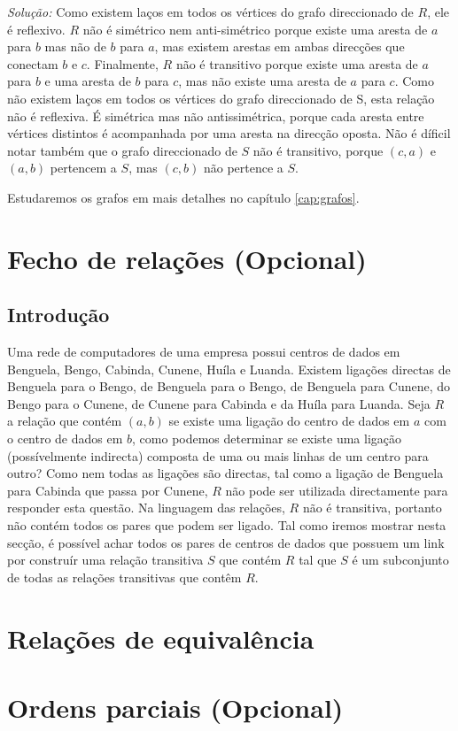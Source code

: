 \emph{Solução:} Como existem laços em todos os vértices do grafo direccionado
de $R$, ele é reflexivo. $R$ não é simétrico nem anti-simétrico porque existe
uma aresta de $a$ para $b$ mas não de $b$ para $a$, mas existem arestas em
ambas direcções que conectam $b$ e $c$. Finalmente, $R$ não é transitivo porque
existe uma aresta de $a$ para $b$ e uma aresta de $b$ para $c$, mas não existe
uma aresta de $a$ para $c$. Como não existem laços em todos os vértices do grafo
direccionado de S, esta relação não é reflexiva. É simétrica mas não
antissimétrica, porque cada aresta entre vértices distintos é acompanhada por
uma aresta na direcção oposta. Não é díficil notar também que o grafo
direccionado de $S$ não é transitivo, porque $(c,a)$ e $(a,b)$ pertencem a $S$,
mas $(c,b)$ não pertence a $S$.

Estudaremos os grafos em mais detalhes no capítulo \ref{cap:grafos}.


\section{Fecho de relações (Opcional)}

\subsection{Introdução}

Uma rede de computadores de uma empresa possui centros de dados em Benguela,
Bengo, Cabinda, Cunene, Huíla e Luanda.
Existem ligações directas de Benguela para o Bengo, de Benguela para o Bengo,
de Benguela para Cunene, do Bengo para o Cunene, de Cunene para Cabinda e da
Huíla para Luanda. Seja $R$ a relação que contém $(a,b)$ se existe uma ligação
do centro de dados em $a$ com o centro de dados em $b$, como podemos determinar
se existe uma ligação (possívelmente indirecta) composta de uma ou mais linhas
de um centro para outro? Como nem todas as ligações são directas, tal como a
ligação de Benguela para Cabinda que passa por Cunene, $R$ não pode ser
utilizada directamente para responder esta questão.
Na linguagem das relações, $R$ não é transitiva, portanto não contém todos os
pares que podem ser ligado. Tal como iremos mostrar nesta secção, é possível
achar todos os pares de centros de dados que possuem um link por construír uma
relação transitiva $S$ que contém $R$ tal que $S$ é um subconjunto de todas as
relações transitivas que contêm $R$.


\section{Relações de equivalência}

\section{Ordens parciais (Opcional)}